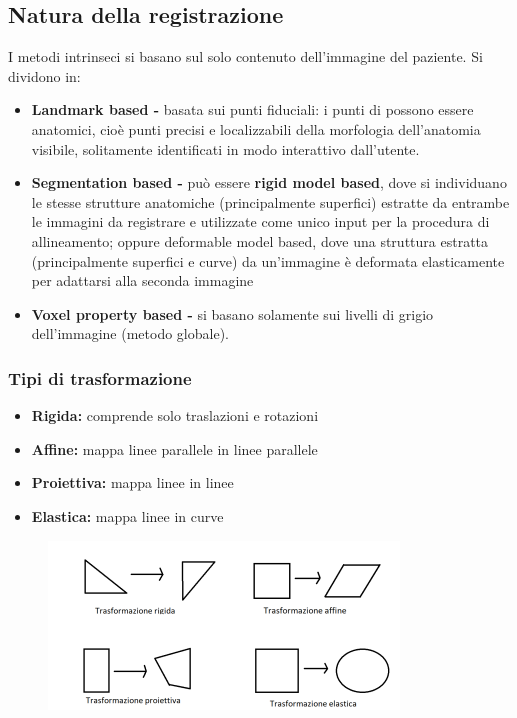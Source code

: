 \subsection{Natura della registrazione}
I metodi intrinseci si basano sul solo contenuto dell'immagine del paziente. Si dividono in:
\begin{itemize}
    \item \textbf{Landmark based -} basata sui punti fiduciali: i punti di possono essere anatomici, cioè punti precisi e
          localizzabili della morfologia dell'anatomia visibile, solitamente identificati in modo interattivo dall'utente.
    \item \textbf{Segmentation based -} può essere \textbf{rigid model based}, dove si
          individuano le stesse strutture anatomiche (principalmente superfici) estratte da entrambe le immagini da registrare e
          utilizzate come unico input per la procedura di allineamento; oppure deformable model based, dove una struttura estratta
          (principalmente superfici e curve) da un'immagine è deformata elasticamente per adattarsi alla seconda immagine
    \item  \textbf{Voxel property based -} si basano solamente sui livelli di grigio
          dell'immagine (metodo globale).
\end{itemize}

\subsubsection{Tipi di trasformazione}
\begin{itemize}
    \item \textbf{Rigida:} comprende solo traslazioni e rotazioni
    \item \textbf{Affine:} mappa linee parallele in linee parallele
    \item \textbf{Proiettiva:} mappa linee in linee
    \item \textbf{Elastica:} mappa linee in curve
\end{itemize}
\begin{figure}[H]
    \centering
    \includegraphics[width=\linewidth, keepaspectratio]{capitoli/immagini/imgs/tipi-trasformazione.png}
\end{figure}

